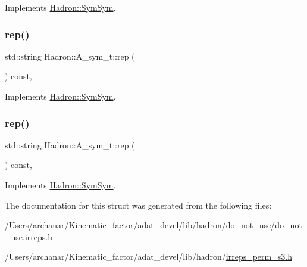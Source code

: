 Implements \mbox{\hyperlink{structHadron_1_1SymSym_aa6e588740862036933a9efe085a5e5e5}{Hadron\+::\+Sym\+Sym}}.

\mbox{\label{structHadron_1_1A__sym__t_ac60fe125eeb713995aafa4712e23f919}} 
\subsubsection{\texorpdfstring{rep()}{rep()}\hspace{0.1cm}{\footnotesize\ttfamily [2/3]}}
{\footnotesize\ttfamily std\+::string Hadron\+::\+A\+\_\+sym\+\_\+t\+::rep (\begin{DoxyParamCaption}{ }\end{DoxyParamCaption}) const\hspace{0.3cm}{\ttfamily [inline]}, {\ttfamily [virtual]}}



Implements \mbox{\hyperlink{structHadron_1_1SymSym_aa6e588740862036933a9efe085a5e5e5}{Hadron\+::\+Sym\+Sym}}.

\mbox{\label{structHadron_1_1A__sym__t_ac60fe125eeb713995aafa4712e23f919}} 
\subsubsection{\texorpdfstring{rep()}{rep()}\hspace{0.1cm}{\footnotesize\ttfamily [3/3]}}
{\footnotesize\ttfamily std\+::string Hadron\+::\+A\+\_\+sym\+\_\+t\+::rep (\begin{DoxyParamCaption}{ }\end{DoxyParamCaption}) const\hspace{0.3cm}{\ttfamily [inline]}, {\ttfamily [virtual]}}



Implements \mbox{\hyperlink{structHadron_1_1SymSym_aa6e588740862036933a9efe085a5e5e5}{Hadron\+::\+Sym\+Sym}}.



The documentation for this struct was generated from the following files\+:\begin{DoxyCompactItemize}
\item 
/\+Users/archanar/\+Kinematic\+\_\+factor/adat\+\_\+devel/lib/hadron/do\+\_\+not\+\_\+use/\mbox{\hyperlink{do__not__use_8irreps_8h}{do\+\_\+not\+\_\+use.\+irreps.\+h}}\item 
/\+Users/archanar/\+Kinematic\+\_\+factor/adat\+\_\+devel/lib/hadron/\mbox{\hyperlink{lib_2hadron_2irreps__perm__s3_8h}{irreps\+\_\+perm\+\_\+s3.\+h}}\end{DoxyCompactItemize}
